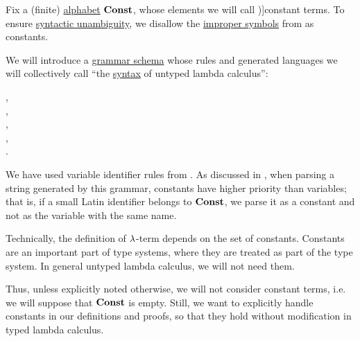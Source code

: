 \begin{definition}\label{def:lambda_term}\mimprovised
  Fix a (finite) \hyperref[def:formal_language/alphabet]{alphabet} \( \op*{Const} \), whose elements we will call \term[en=constant (\cite[202]{Andrews2002Logic})]{constant terms}. To ensure \hyperref[def:grammar_ambiguity]{syntactic unambiguity}, we disallow the \hyperref[con:improper_symbol]{improper symbols} from  as constants.

  We will introduce a \hyperref[def:formal_grammar/schema]{grammar schema} whose rules and generated languages we will collectively call \enquote{the \hyperref[con:syntax_semantics_duality]{syntax} of untyped lambda calculus}:
  \begin{bnf*}
        {}, \\
            { \bnfor {}}, \\
     {\bnftsq{\( ( \)} \bnfsp {} \bnfsp {} \bnfsp \bnftsq{\( ) \)}}, \\
     {\bnftsq{\( ( \)} \bnfsp \bnftsq{\( \synlambda \)} \bnfsp {} \bnfsp {} \bnfsp {} \bnfsp \bnftsq{\( ) \)}}, \\
            { \bnfor {} \bnfor {}}.
  \end{bnf*}

  We have used variable identifier rules from . As discussed in , when parsing a string generated by this grammar, constants have higher priority than variables; that is, if a small Latin identifier belongs to \( \op*{Const} \), we parse it as a constant and not as the variable with the same name.

  \begin{thmenum}
     Technically, the definition of \( {\mathrm \lambda} \)-term depends on the set of constants. Constants are an important part of type systems, where they are treated as part of the type system. In general untyped lambda calculus, we will not need them.

    Thus, unless explicitly noted otherwise, we will not consider constant terms, i.e. we will suppose that \( \op*{Const} \) is empty. Still, we want to explicitly handle constants in our definitions and proofs, so that they hold without modification in typed lambda calculus.


\end{thmenum}
\end{definition}
